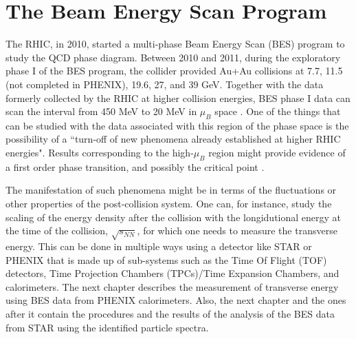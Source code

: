 \section{The Beam Energy Scan Program}
The RHIC, in 2010, started a multi-phase Beam Energy Scan (BES) program to study the QCD phase diagram. Between 2010 and 2011, during the exploratory phase I of the BES program, the collider provided Au+Au collisions at 7.7, 11.5 (not completed in PHENIX), 19.6, 27, and 39 GeV. Together with the data formerly collected by the RHIC at higher collision energies, BES phase I data can scan the interval from 450 MeV to 20 MeV in $\mu_{B}$ space \cite{1742-6596-455-1-012037, LUO201675}. One of the things that can be studied with the data associated with this region of the phase space is the possibility of a ``turn-off of new phenomena already established at higher RHIC energies"\cite{1742-6596-455-1-012037}. Results corresponding to the high-$\mu_{B}$ region might provide evidence of a first order phase transition, and possibly the critical point \cite{LUO201675}.

The manifestation of such phenomena might be in terms of the fluctuations or other properties of the post-collision system. One can, for instance, study the scaling of the energy density after the collision with the longidutional energy at the time of the collision, $\sqrt{s_{NN}}$, for which one needs to measure the transverse energy. This can be done in multiple ways using a detector like STAR or PHENIX that is made up of sub-systems such as the Time Of Flight (TOF) detectors, Time Projection Chambers (TPCs)/Time Expansion Chambers, and calorimeters. The next chapter describes the measurement of transverse energy using BES data from PHENIX calorimeters. Also, the next chapter and the ones after it contain the procedures and the results of the analysis of the BES data from STAR using the identified particle spectra.

